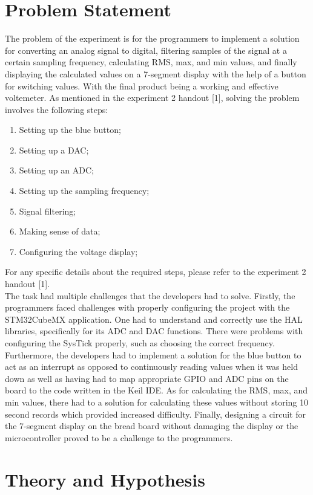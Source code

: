 \documentclass[12pt]{report}
\begin{document}
\section{Problem Statement}
The problem of the experiment is for the programmers to implement a solution for converting an analog signal to digital, filtering samples of the signal at a certain sampling frequency, calculating RMS, max, and min values, and finally displaying the calculated values on a 7-segment display with the help of a button for switching values. With the final product being a working and effective voltemeter.
As mentioned in the experiment 2 handout [1], solving the problem involves the following steps:
\begin{enumerate}
  \item Setting up the blue button;
  \item Setting up a DAC;
  \item Setting up an ADC;
  \item Setting up the sampling frequency;
  \item Signal filtering;
  \item Making sense of data;
  \item Configuring the voltage display;
\end{enumerate}
For any specific details about the required steps, please refer to the experiment 2 handout [1].\\
The task had multiple challenges that the developers had to solve.
Firstly, the programmers faced challenges with properly configuring the project with the STM32CubeMX
application. One had to understand and correctly use the HAL libraries, specifically for its ADC and
DAC functions. There were problems with configuring the SysTick properly, such as choosing the
correct frequency. Furthermore, the developers had to implement a solution for the blue button to
act as an interrupt as opposed to continuously reading values when it was held down as well as
having had to map appropriate GPIO and ADC pins on the board to the code written in the Keil IDE. As
for calculating the RMS, max, and min values, there had to a solution for calculating these values
without storing 10 second records which provided increased difficulty. Finally, designing a circuit
for the 7-segment display on the bread board without damaging the display or the microcontroller
proved to be a challenge to the programmers.
\section{Theory and Hypothesis}
\end{document}
